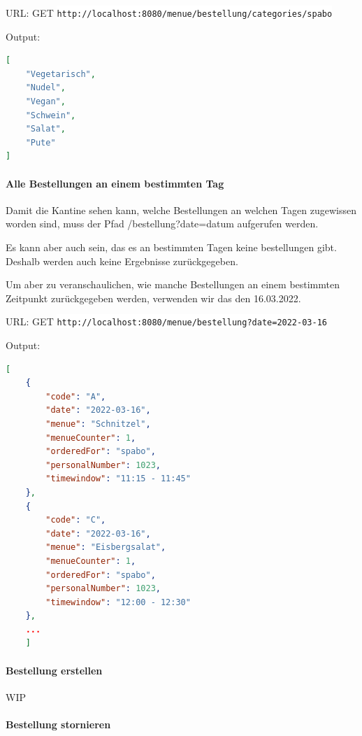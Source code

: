 URL: GET \colorbox{white}{\lstinline[basicstyle=\ttfamily\color{black},language=html]|http://localhost:8080/menue/bestellung/categories/spabo|}

Output:

\begin{lstlisting}[language=json,firstnumber=1]
[
    "Vegetarisch",
    "Nudel",
    "Vegan",
    "Schwein",
    "Salat",
    "Pute"
]
\end{lstlisting}


\paragraph{Alle Bestellungen an einem bestimmten Tag}

Damit die Kantine sehen kann, welche Bestellungen an welchen Tagen zugewissen worden sind, muss der Pfad /bestellung?date=datum aufgerufen werden.

Es kann aber auch sein, das es an bestimmten Tagen keine bestellungen gibt. Deshalb werden auch keine Ergebnisse zurückgegeben.

Um aber zu veranschaulichen, wie manche Bestellungen an einem bestimmten Zeitpunkt zurückgegeben werden, verwenden wir das den 16.03.2022.

URL: GET \colorbox{white}{\lstinline[basicstyle=\ttfamily\color{black},language=html]|http://localhost:8080/menue/bestellung?date=2022-03-16|}

Output:

\begin{lstlisting}[language=json,firstnumber=1]
[
    {
        "code": "A",
        "date": "2022-03-16",
        "menue": "Schnitzel",
        "menueCounter": 1,
        "orderedFor": "spabo",
        "personalNumber": 1023,
        "timewindow": "11:15 - 11:45"
    },
    {
        "code": "C",
        "date": "2022-03-16",
        "menue": "Eisbergsalat",
        "menueCounter": 1,
        "orderedFor": "spabo",
        "personalNumber": 1023,
        "timewindow": "12:00 - 12:30"
    },
    ...
    ]
\end{lstlisting}


\paragraph{Bestellung erstellen}

WIP


\paragraph{Bestellung stornieren}

